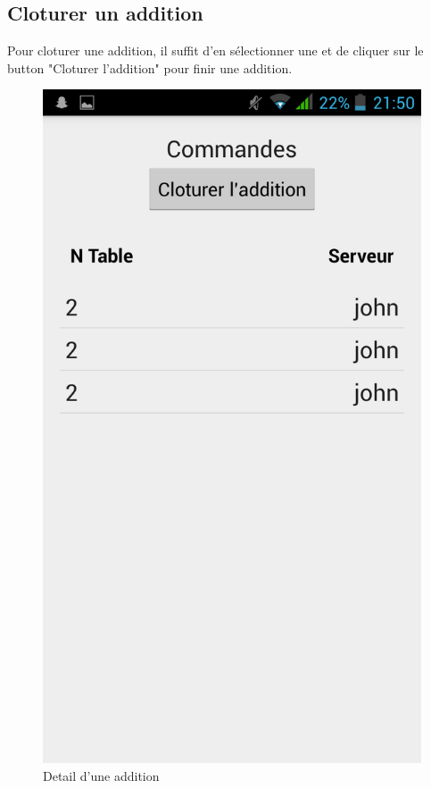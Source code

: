 \subsection{Cloturer un addition}
Pour cloturer une addition, il suffit d'en sélectionner une et de cliquer sur le button "Cloturer l'addition" pour finir une addition.

\begin{figure}[H]
	\centering
	\includegraphics[scale=0.15]{img/details-bill.png}
	\caption{Detail d'une addition}
	\label{fig:bill-details}
\end{figure}

